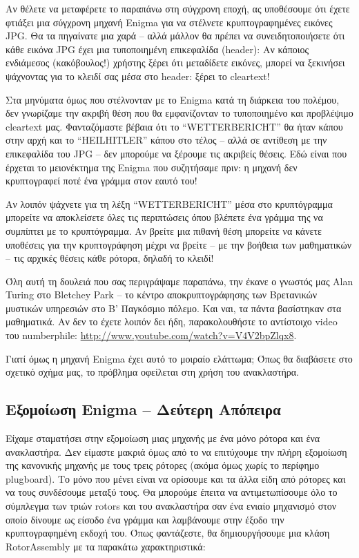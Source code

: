 \documentclass[a4paper,twoside,12pt]{article}
\begin{document}
Αν θέλετε να μεταφέρετε το παραπάνω στη σύγχρονη εποχή, ας υποθέσουμε ότι έχετε φτιάξει μια σύγχρονη μηχανή Enigma για να στέλνετε κρυπτογραφημένες εικόνες JPG. Θα τα πηγαίνατε μια χαρά – αλλά μάλλον θα πρέπει να συνειδητοποιήσετε ότι κάθε εικόνα JPG έχει μια τυποποιημένη επικεφαλίδα (header): Αν κάποιος ενδιάμεσος (κακόβουλος!) χρήστης ξέρει ότι μεταδίδετε εικόνες, μπορεί να ξεκινήσει ψάχνοντας για το κλειδί σας μέσα στο header: ξέρει το cleartext!

Στα μηνύματα όμως που στέλνονταν με το Enigma κατά τη διάρκεια του πολέμου, δεν γνωρίζαμε την ακριβή θέση που θα εμφανίζονταν το τυποποιημένο και προβλέψιμο cleartext μας. Φανταζόμαστε βέβαια ότι το “WETTERBERICHT” θα ήταν κάπου στην αρχή και το “HEILHITLER” κάπου στο τέλος – αλλά σε αντίθεση με την επικεφαλίδα του JPG – δεν μπορούμε να ξέρουμε τις ακριβείς θέσεις. Εδώ είναι που έρχεται το μειονέκτημα της Enigma που συζητήσαμε πριν: η μηχανή δεν κρυπτογραφεί ποτέ ένα γράμμα στον εαυτό του!

Αν λοιπόν ψάχνετε για τη λέξη “WETTERBERICHT” μέσα στο κρυπτόγραμμα μπορείτε να αποκλείσετε όλες τις περιπτώσεις όπου βλέπετε ένα γράμμα της να συμπίπτει με το κρυπτόγραμμα. Αν βρείτε μια πιθανή θέση μπορείτε να κάνετε υποθέσεις για την κρυπτογράφηση μέχρι να βρείτε – με την βοήθεια των μαθηματικών – τις αρχικές θέσεις κάθε ρότορα, δηλαδή το κλειδί!

Όλη αυτή τη δουλειά που σας περιγράψαμε παραπάνω, την έκανε ο γνωστός μας Alan Turing στο Bletchey Park – το κέντρο αποκρυπτογράφησης των Βρετανικών μυστικών υπηρεσιών στο Β' Παγκόσμιο πόλεμο. Και ναι, τα πάντα βασίστηκαν στα μαθηματικά. Αν δεν το έχετε λοιπόν δει ήδη, παρακολουθήστε το αντίστοιχο video του numberphile: \url{http://www.youtube.com/watch?v=V4V2bpZlqx8}.

Γιατί όμως η μηχανή Enigma έχει αυτό το μοιραίο ελάττωμα; Όπως θα διαβάσετε στο σχετικό σχήμα μας, το πρόβλημα οφείλεται στη χρήση του ανακλαστήρα.

\subsection{Εξομοίωση Enigma – Δεύτερη Απόπειρα}

Είχαμε σταματήσει στην εξομοίωση μιας μηχανής με ένα μόνο ρότορα και ένα ανακλαστήρα. Δεν είμαστε μακριά όμως από το να επιτύχουμε την πλήρη εξομοίωση της κανονικής μηχανής με τους τρεις ρότορες (ακόμα όμως χωρίς το περίφημο plugboard). Το μόνο που μένει είναι να ορίσουμε και τα άλλα είδη από ρότορες και να τους συνδέσουμε μεταξύ τους. Θα μπορούμε έπειτα να αντιμετωπίσουμε όλο το σύμπλεγμα των τριών rotors και του ανακλαστήρα σαν ένα ενιαίο μηχανισμό στον οποίο δίνουμε ως είσοδο ένα γράμμα και λαμβάνουμε στην έξοδο την κρυπτογραφημένη εκδοχή του. Όπως φαντάζεστε, θα δημιουργήσουμε μια κλάση RotorAssembly με τα παρακάτω χαρακτηριστικά:
\end{document}

